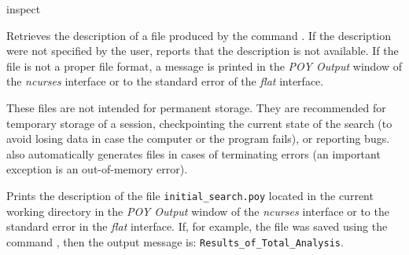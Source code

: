 \begin{command}{inspect}{}

\syntax{\obligatory{(\poystring)}} 

\begin{poydescription}
Retrieves the description of a \poy file produced by the command . 
If the description were not specified by the user,  reports 
that the description is not available. If the file is not a proper \poy file format, a 
message is printed in the \emph{POY Output} window of the \emph{ncurses} 
interface or to the standard error of the \emph{flat} interface.

These \poy files are not intended for permanent storage. They are recommended
for temporary storage of a \poy session, checkpointing the current state of 
the search (to avoid losing data in case the computer or the program fails), 
or reporting bugs. \poy also automatically generates \poy files in cases of 
terminating errors (an important exception is an out-of-memory error). 

\end{poydescription}

\begin{poyexamples}
{Prints the description of the \poy file \texttt{initial\_search.poy}
located in the current working directory in the \emph{POY Output}
window of the \emph{ncurses} interface or to the standard error in the \emph{flat}
interface. If, for example, the file was saved using
the command , 
then the output message is: \texttt{Results\_of\_Total\_Analysis}.}
\end{poyexamples}

\begin{poyalso}
\end{poyalso}

\end{command}


